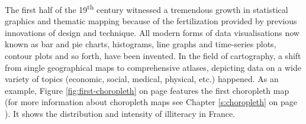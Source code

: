 The first half of the 19\textsuperscript{th} century witnessed a tremendous growth in statistical graphics and thematic mapping because of the fertilization provided by previous innovations of design and technique. All modern forms of data visualisations now known as bar and pie charts, histograms, line graphs and time-series plots, contour plots and so forth, have been invented. In the field of cartography, a shift from single geographical maps to comprehensive atlases, depicting data on a wide variety of topics (economic, social, medical, physical, etc.) happened. As an example, Figure \ref{fig:first-choropleth} on page \pageref{fig:first-choropleth} features the first choropleth map (for more information about choropleth maps see Chapter \ref{s:choropleth} on page \pageref{s:choropleth}). It shows the distribution and intensity of illiteracy in France.

